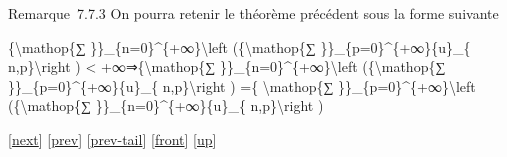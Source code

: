 \documentclass[]{article}
\begin{document}
Remarque~7.7.3 On pourra retenir le théorème précédent sous la forme
suivante

\{\textbackslash{}mathop\{∑ \}\}\_\{n=0\}\^{}\{+∞\}\textbackslash{}left
(\{\textbackslash{}mathop\{∑ \}\}\_\{p=0\}\^{}\{+∞\}\textbar{}\{u\}\_\{
n,p\}\textbar{}\textbackslash{}right ) \textless{}
+∞⇒\{\textbackslash{}mathop\{∑
\}\}\_\{n=0\}\^{}\{+∞\}\textbackslash{}left (\{\textbackslash{}mathop\{∑
\}\}\_\{p=0\}\^{}\{+∞\}\{u\}\_\{ n,p\}\textbackslash{}right ) =\{
\textbackslash{}mathop\{∑ \}\}\_\{p=0\}\^{}\{+∞\}\textbackslash{}left
(\{\textbackslash{}mathop\{∑ \}\}\_\{n=0\}\^{}\{+∞\}\{u\}\_\{
n,p\}\textbackslash{}right )

{[}\href{coursse42.html}{next}{]} {[}\href{coursse40.html}{prev}{]}
{[}\href{coursse40.html\#tailcoursse40.html}{prev-tail}{]}
{[}\href{coursse41.html}{front}{]}
{[}\href{coursch8.html\#coursse41.html}{up}{]}
\end{document}
